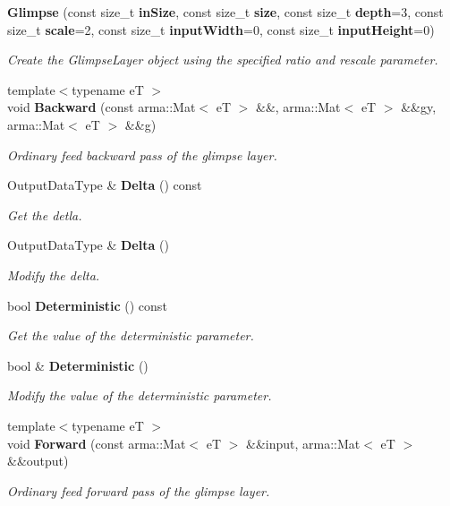 \begin{DoxyCompactItemize}
\item 
{\bf Glimpse} (const size\+\_\+t {\bf in\+Size}, const size\+\_\+t {\bf size}, const size\+\_\+t {\bf depth}=3, const size\+\_\+t {\bf scale}=2, const size\+\_\+t {\bf input\+Width}=0, const size\+\_\+t {\bf input\+Height}=0)
\begin{DoxyCompactList}\small\item\em Create the Glimpse\+Layer object using the specified ratio and rescale parameter. \end{DoxyCompactList}\item 
{\footnotesize template$<$typename eT $>$ }\\void {\bf Backward} (const arma\+::\+Mat$<$ eT $>$ \&\&, arma\+::\+Mat$<$ eT $>$ \&\&gy, arma\+::\+Mat$<$ eT $>$ \&\&g)
\begin{DoxyCompactList}\small\item\em Ordinary feed backward pass of the glimpse layer. \end{DoxyCompactList}\item 
Output\+Data\+Type \& {\bf Delta} () const 
\begin{DoxyCompactList}\small\item\em Get the detla. \end{DoxyCompactList}\item 
Output\+Data\+Type \& {\bf Delta} ()
\begin{DoxyCompactList}\small\item\em Modify the delta. \end{DoxyCompactList}\item 
bool {\bf Deterministic} () const 
\begin{DoxyCompactList}\small\item\em Get the value of the deterministic parameter. \end{DoxyCompactList}\item 
bool \& {\bf Deterministic} ()
\begin{DoxyCompactList}\small\item\em Modify the value of the deterministic parameter. \end{DoxyCompactList}\item 
{\footnotesize template$<$typename eT $>$ }\\void {\bf Forward} (const arma\+::\+Mat$<$ eT $>$ \&\&input, arma\+::\+Mat$<$ eT $>$ \&\&output)
\begin{DoxyCompactList}\small\item\em Ordinary feed forward pass of the glimpse layer. \end{DoxyCompactList}\item 

\end{DoxyCompactItemize}

